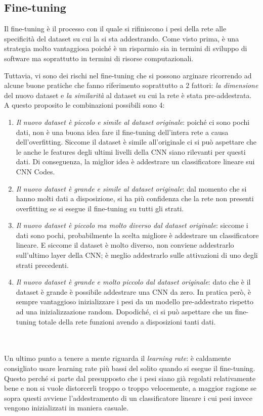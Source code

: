 \subsection{Fine-tuning}
Il fine-tuning è il processo con il quale si rifiniscono i pesi della rete alle specificità del dataset su cui la si sta addestrando. Come visto prima, è una strategia molto vantaggiosa poiché è un risparmio sia in termini di sviluppo di software ma soprattutto in termini di risorse computazionali. 

Tuttavia, vi sono dei rischi nel fine-tuning che si possono arginare ricorrendo ad alcune buone pratiche che fanno riferimento soprattutto a 2 fattori: \emph{la dimensione} del nuovo dataset e \emph{la similarità} al dataset su cui la rete è stata pre-addestrata. \\
A questo proposito le combinazioni possibili sono 4: 
\begin{enumerate}
\item \emph{Il nuovo dataset è piccolo e simile al dataset originale}:  poiché ci sono pochi dati, non è una buona idea fare il fine-tuning dell'intera rete a causa dell'overfitting. Siccome il dataset è simile all'originale ci si può aspettare che le anche le features degli ultimi livelli della CNN siano rilevanti per questi dati. Di conseguenza, la miglior idea è addestrare un classificatore lineare sui CNN Codes.

\item \emph{Il nuovo dataset è grande e simile al dataset originale}: dal momento che si hanno molti dati a disposizione, si ha più confidenza che la rete non presenti overfitting se si esegue il fine-tuning su tutti gli strati.

\item \emph{Il nuovo dataset è piccolo ma molto diverso dal dataset originale}: siccome i dati sono pochi, probabilmente la scelta migliore è addestrare un classificatore lineare. E siccome il dataset è  molto diverso, non conviene addestrarlo sull'ultimo layer della CNN; è meglio addestrarlo sulle attivazioni di uno degli strati precedenti. 
\item \emph{Il nuovo dataset è grande e molto piccolo dal dataset originale}: dato che è il dataset è grande è possibile addestrare una CNN da zero. In pratica però, è sempre vantaggioso inizializzare i pesi da un modello pre-addestrato rispetto ad una inizializzazione random. Dopodiché, ci si può aspettare che un fine-tuning totale della rete funzioni avendo a disposizioni tanti dati. 
\end{enumerate}
\\
\\
Un ultimo punto a tenere a mente riguarda il \emph{learning rate}: è caldamente consigliato usare learning rate più bassi del solito quando si esegue il fine-tuning. Questo perché si parte dal presupposto che i pesi siano già regolati relativamente bene e non si vuole distorcerli troppo o troppo velocemente, a maggior ragione se sopra questi avviene l'addestramento di un classificatore lineare i cui pesi invece vengono inizializzati in maniera casuale.  
